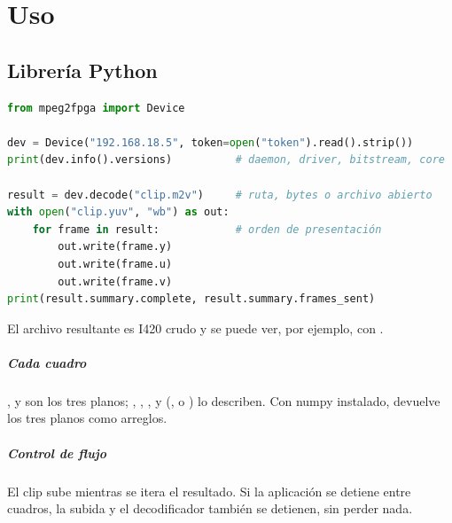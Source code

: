 \chapter{Uso}

\section{Librería Python}

\begin{lstlisting}[language=Python]
from mpeg2fpga import Device

dev = Device("192.168.18.5", token=open("token").read().strip())
print(dev.info().versions)          # daemon, driver, bitstream, core

result = dev.decode("clip.m2v")     # ruta, bytes o archivo abierto
with open("clip.yuv", "wb") as out:
    for frame in result:            # orden de presentación
        out.write(frame.y)
        out.write(frame.u)
        out.write(frame.v)
print(result.summary.complete, result.summary.frames_sent)
\end{lstlisting}

El archivo resultante es I420 crudo y se puede ver, por ejemplo, con
.

\paragraph{Cada cuadro} ,  y  son los
tres planos; , ,
,  y
 (,  o ) lo describen.
Con numpy instalado,  devuelve los tres planos como
arreglos.

\paragraph{Control de flujo} El clip sube mientras se itera el resultado. Si
la aplicación se detiene entre cuadros, la subida y el decodificador también
se detienen, sin perder nada.

